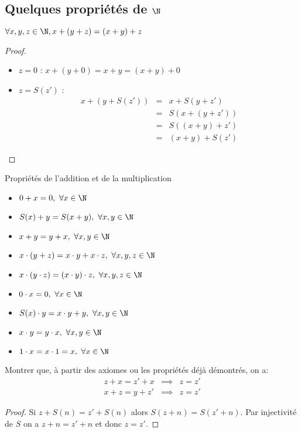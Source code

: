 \subsection{Quelques propriétés de $\N$}


\begin{prop}
	$\forall x, y, z \in \N, x + (y + z) = (x + y) + z$
\end{prop}

\begin{proof}
	\begin{itemize}
		\item $z = 0$ : $x + (y + 0) = x + y = (x + y) + 0$
		\item $z = S(z')$ :
		      \begin{eqnarray*}
			      x + (y + S(z')) & = & x + S(y + z') \\
			      & = & S(x + (y + z')) \\
			      & = & S((x + y) + z') \\
			      & = & (x + y) + S(z')
		      \end{eqnarray*}
	\end{itemize}
\end{proof}

\begin{prop} Propriétés de l'addition et de la multiplication
	\begin{itemize}
		\item $ 0 + x = 0, \ \forall x \in \N$
		\item $S(x) + y = S(x + y), \ \forall x, y \in \N$
		\item $x + y = y + x, \ \forall x, y \in \N$
		\item $x \cdot (y + z) = x \cdot y + x \cdot z, \ \forall x, y, z \in \N$
		\item $x \cdot ( y \cdot z) = (x \cdot y) \cdot z, \ \forall x, y, z \in \N$
		\item $ 0 \cdot x = 0, \ \forall x \in \N$
		\item $S(x) \cdot y = x \cdot y + y, \ \forall x, y \in \N$
		\item $x \cdot y = y \cdot x, \ \forall x, y \in \N$
		\item $1 \cdot x =  x \cdot 1 =  x, \ \forall x \in \N$
	\end{itemize}
\end{prop}


\begin{example}
	Montrer que, à partir des axiomes ou les propriétés déjà démontrés, on a:
	\begin{eqnarray*}
		z + x  = z' + x &\implies& z = z' \\
		x + z  = y + z' &\implies& z = z'
	\end{eqnarray*}
\end{example}

\begin{proof}
	Si $z + S(n) = z' + S(n)$ alors $S(z + n) = S(z' + n)$.
	Par injectivité de $S$ on a $z + n = z' + n$ et donc $z = z'$.
\end{proof}
